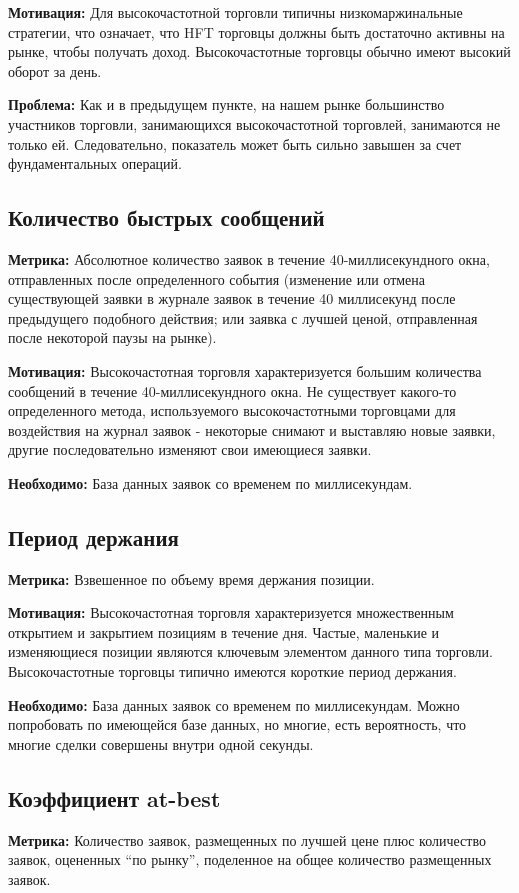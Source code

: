 \documentclass{article}
\begin{document}
		\noindent
		\textbf{Мотивация:} Для высокочастотной торговли типичны низкомаржинальные стратегии, что означает, что HFT торговцы должны быть достаточно активны на рынке, чтобы получать доход. Высокочастотные торговцы обычно имеют высокий оборот за день.

		\noindent
		\textbf{Проблема:} Как и в предыдущем пункте, на нашем рынке большинство участников торговли, занимающихся высокочастотной торговлей, занимаются не только ей. Следовательно, показатель может быть сильно завышен за счет фундаментальных операций.

	\subsection*{Количество быстрых сообщений}
		\noindent
		\textbf{Метрика:} Абсолютное количество заявок в течение 40-миллисекундного окна, отправленных после определенного события (изменение или отмена существующей заявки в журнале заявок в течение 40 миллисекунд после предыдущего подобного действия; или заявка с лучшей ценой, отправленная после некоторой паузы на рынке).

		\noindent
		\textbf{Мотивация:} Высокочастотная торговля характеризуется большим количества сообщений в течение 40-миллисекундного окна.  Не существует какого-то определенного метода, используемого высокочастотными торговцами для воздействия на журнал заявок - некоторые снимают и выставляю новые заявки, другие последовательно изменяют свои имеющиеся заявки.

		\noindent
		\textbf{Необходимо:} База данных заявок со временем по миллисекундам. 

	\subsection*{Период держания}
		\noindent
		\textbf{Метрика:} Взвешенное по объему время держания позиции.

		\noindent
		\textbf{Мотивация:} Высокочастотная торговля характеризуется множественным открытием и закрытием позициям в течение дня. Частые, маленькие и изменяющиеся позиции являются ключевым элементом данного типа торговли. Высокочастотные торговцы типично имеются короткие период держания.
		
		\noindent
		\textbf{Необходимо:} База данных заявок со временем по миллисекундам. Можно попробовать по имеющейся базе данных, но многие, есть вероятность, что многие сделки совершены внутри одной секунды.

	\subsection*{Коэффициент at-best}
		\noindent
		\textbf{Метрика:} Количество заявок, размещенных по лучшей цене плюс количество заявок, оцененных ``по рынку'', поделенное на общее количество размещенных заявок.
\end{document}
